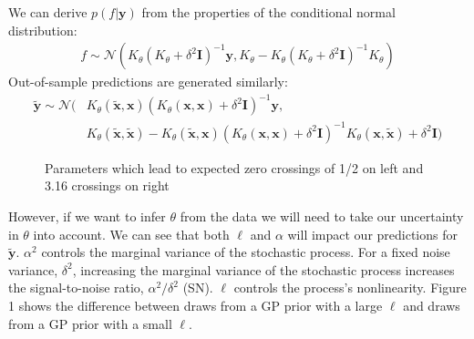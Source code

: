 \documentclass{article}
\begin{document}
We can derive $p(f | \mathbf{y})$ from the properties of the conditional normal
distribution: 
\begin{align*}
  f \sim
  \mathcal{N}(K_\theta  (K_\theta + \delta ^ 2 \mathbf{I})^{-1}\mathbf{y},  
  K_\theta - K_\theta (K_\theta + \delta ^ 2 \mathbf{I})^{-1}K_\theta)
\end{align*}
Out-of-sample predictions are generated similarly:
\begin{align*} 
  \mathbf{\tilde{y}} \sim
  \mathcal{N}(&K_\theta(\mathbf{\tilde{x}},\mathbf{x}) (K_\theta(\mathbf{x},\mathbf{x}) +
  \delta ^ 2 \mathbf{I})^{-1}\mathbf{y},  
   \\ & K_\theta(\mathbf{\tilde{x}},\mathbf{\tilde{x}}) -K_\theta(\mathbf{\tilde{x}},\mathbf{x}) (K_\theta(\mathbf{x},\mathbf{x}) + \delta ^ 2 \mathbf{I})^{-1}K_\theta(\mathbf{x},\mathbf{\tilde{x}}) + \delta ^ 2 \mathbf{I})
\end{align*}
\begin{figure} \label{prior-lat-draws}
  \caption{Parameters which lead to expected zero crossings of 1/2 on left and 3.16 crossings on right} \label{prior-lat-draws}
\end{figure}
However, if we want to infer $\theta$ from the data we will need to take our
uncertainty in $\theta$ into account. We can see that both $\ell$ and $\alpha$
will impact our predictions for $\tilde{\mathbf{y}}$. $\alpha^2$ controls the
marginal variance of the stochastic process. For a fixed noise variance,
$\delta^2$, increasing the marginal variance of the stochastic process
increases the signal-to-noise ratio, $\alpha^2 / \delta^2$ (SN). $\ell$
controls the process's nonlinearity. Figure 1 shows the
difference between draws from a GP prior with a large $\ell$ and draws from a
GP prior with a small $\ell$.
\end{document}
